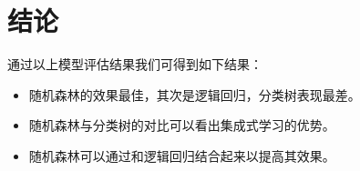 \chapter{结论}
通过以上模型评估结果我们可得到如下结果：
\begin{itemize}
	\item 随机森林的效果最佳，其次是逻辑回归，分类树表现最差。
	\item 随机森林与分类树的对比可以看出集成式学习的优势。
	\item 随机森林可以通过和逻辑回归结合起来以提高其效果。
\end{itemize}